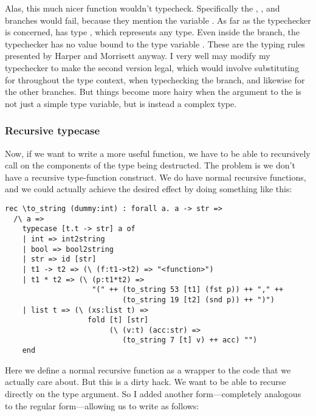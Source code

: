 \documentclass[pageno]{jpaper}
\begin{document}
{{{Alas, this much nicer function wouldn't typecheck. Specifically the , ,
and  branches would fail, because they mention the variable . As far as the typechecker is concerned,  has type , which represents any type. Even inside the  branch,
the typechecker has no value bound to the type variable . These are the typing rules presented by
Harper and Morrisett anyway. I very well may modify my typechecker to make the second version legal,
which would involve substituting  for  throughout the type context, when typechecking
the  branch, and likewise for the other branches. But things become more hairy when
the argument to the  is not just a simple type variable, but is instead a complex
type. 

\subsubsection{Recursive typecase}

Now, if we want to write a more useful  function, we have to be able to recursively call
 on the components of the type being destructed.
The problem is we don't have a recursive type-function construct. We do have normal recursive functions,
and we could actually achieve the desired effect by doing something like this:

\begin{lstlisting}[mathescape]
rec \to_string (dummy:int) : forall a. a -> str =>
  /\ a =>
    typecase [t.t -> str] a of
    | int => int2string
    | bool => bool2string
    | str => id [str]
    | t1 -> t2 => (\ (f:t1->t2) => "<function>")
    | t1 * t2 => (\ (p:t1*t2) => 
                    "(" ++ (to_string 53 [t1] (fst p)) ++ "," ++
                           (to_string 19 [t2] (snd p)) ++ ")")
    | list t => (\ (xs:list t) =>
                   fold [t] [str] 
                        (\ (v:t) (acc:str) =>
                           (to_string 7 [t] v) ++ acc) "")
    end
\end{lstlisting}

Here we define a normal recursive function as a wrapper to the code that we actually care about.
But this is a dirty hack.  We want to be able to recurse directly on the type argument. So I added another 
form---completely analogous to the regular  form---allowing us to write  as follows:

}}}
\end{document}
